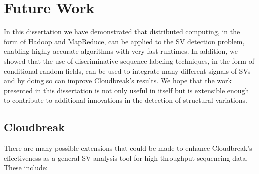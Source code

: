 \chapter{Future Work}\label{chap_future_work}

In this dissertation we have demonstrated that distributed computing, in the form of Hadoop and MapReduce, can be applied to the SV detection problem, enabling highly accurate algorithms with very fast runtimes. In addition, we showed that the use of discriminative sequence labeling techniques, in the form of conditional random fields, can be used to integrate many different signals of SVs and by doing so can improve Cloudbreak's results. We hope that the work presented in this dissertation is not only useful in itself but is extensible enough to contribute to additional innovations in the detection of structural variations.

\section{Cloudbreak}

There are many possible extensions that could be made to enhance Cloudbreak's effectiveness as a general SV analysis tool for high-throughput sequencing data. These include:

